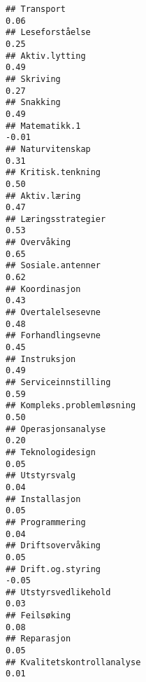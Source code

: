 \documentclass[
]{article}
\begin{document}
\begin{verbatim}
## Transport                                                                         0.06
## Leseforståelse                                                                    0.25
## Aktiv.lytting                                                                     0.49
## Skriving                                                                          0.27
## Snakking                                                                          0.49
## Matematikk.1                                                                     -0.01
## Naturvitenskap                                                                    0.31
## Kritisk.tenkning                                                                  0.50
## Aktiv.læring                                                                      0.47
## Læringsstrategier                                                                 0.53
## Overvåking                                                                        0.65
## Sosiale.antenner                                                                  0.62
## Koordinasjon                                                                      0.43
## Overtalelsesevne                                                                  0.48
## Forhandlingsevne                                                                  0.45
## Instruksjon                                                                       0.49
## Serviceinnstilling                                                                0.59
## Kompleks.problemløsning                                                           0.50
## Operasjonsanalyse                                                                 0.20
## Teknologidesign                                                                   0.05
## Utstyrsvalg                                                                       0.04
## Installasjon                                                                      0.05
## Programmering                                                                     0.04
## Driftsovervåking                                                                  0.05
## Drift.og.styring                                                                 -0.05
## Utstyrsvedlikehold                                                                0.03
## Feilsøking                                                                        0.08
## Reparasjon                                                                        0.05
## Kvalitetskontrollanalyse                                                          0.01

\end{verbatim}
\end{document}

